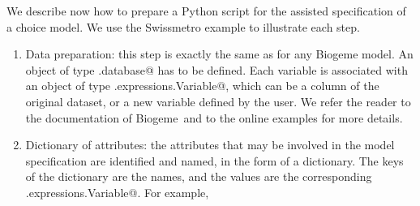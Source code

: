\documentclass[12pt,a4paper]{article}
\newcommand{\PDBIOGEME}{Biogeme}
\begin{document}
We describe now how to prepare a Python script for the assisted
specification of a choice model. We use the Swissmetro example to
illustrate each step.

\begin{enumerate}
\item \label{item:data}Data preparation: this step is exactly the same as for any
  Biogeme model. An object of type \lstinline@biogeme.database@ has to
  be defined. Each variable is associated with an object of type
  \lstinline@biogeme.expressions.Variable@, which can be a column of
  the original dataset, or a new variable defined by the user. We
  refer the reader to the documentation of \PDBIOGEME\ and to the
  online examples for more details.
\item \label{item:attributes}Dictionary of attributes: the attributes that may be involved in
  the model specification are identified and named, in the form of a
  dictionary. The keys of the dictionary are the names, and the values
  are the corresponding  \lstinline@biogeme.expressions.Variable@. For
  example,


\end{enumerate}
\end{document}
